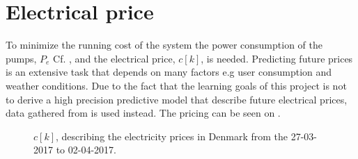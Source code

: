 \chapter{Electrical price}\label{sec:cost_fkt} %
%
%
To minimize the running cost of the system the power consumption of the pumps, $P_e$ Cf. , and the electrical price, $c[k]$, is needed. Predicting future prices is an extensive task that depends on many factors e.g user consumption and weather conditions. Due to the fact that the learning goals of this project is not to derive a high precision predictive model that describe future electrical prices, data gathered from \cite{Electrical_price} is used instead. The pricing can be seen on . 





	


\begin{figure}[H]
\centering

\caption{$c[k]$, describing the electricity prices in Denmark from the 27-03-2017 to 02-04-2017.}
\label{fig:electrical_price} 
\end{figure}

